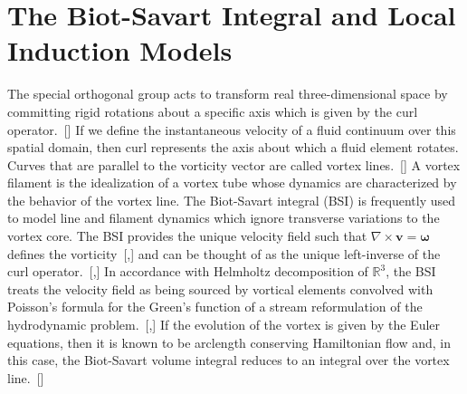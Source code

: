 \documentclass[aps,graphicx,reprint,onecolumn,12pt,tightenlines,longbibliography]{revtex4-1}
\begin{document}
%
\section{\label{sec:BSI} The Biot-Savart Integral and Local Induction Models}
%
The special orthogonal group acts to transform real three-dimensional space by committing rigid rotations about a specific axis which is given by the curl operator.~[] If we define the instantaneous velocity of a fluid continuum over this spatial domain, then curl represents the axis about which a fluid element rotates. Curves that are parallel to the vorticity vector are called {vortex lines}.~[] A vortex filament is the idealization of a vortex tube whose dynamics are characterized by the behavior of the vortex line. The Biot-Savart integral (BSI) is frequently used to model line and filament dynamics which ignore transverse variations to the vortex core. The BSI provides the unique velocity field such that $\nabla \times \bm{v}=\boldsymbol{\omega}$ defines the vorticity~[,] and can be thought of as the unique left-inverse of the curl operator.~[,] In accordance with Helmholtz decomposition of $\mathbb{R}^{3}$, the BSI treats the  velocity field as being sourced by vortical elements convolved with Poisson's formula for the Green's function of a stream reformulation of the hydrodynamic problem.~[,] If the evolution of the vortex is given by the Euler equations, then it is known to be arclength conserving Hamiltonian flow and, in this case, the Biot-Savart volume integral reduces to an integral over the vortex line.~[]
\end{document}
